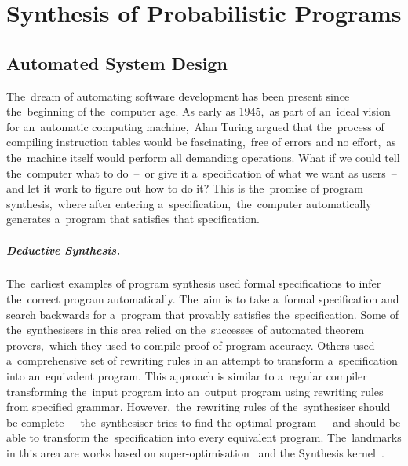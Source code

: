 \chapter{Synthesis of Probabilistic Programs} \label{chap:synthesis_methods}

\section{Automated System Design}

The~dream of automating software development has been present since the~beginning of the~computer age. 
As early as 1945,~as part of an~ideal vision for an~automatic computing machine,~Alan Turing argued that the~process of compiling instruction tables would be fascinating,~free of errors and no effort,~as the~machine itself would perform all demanding operations.
What if we could tell the~computer what to do \,--\, or give it a~specification of what we want as users \,--\, and let it work to figure out how to do it? 
This is the~promise of program synthesis,~where after entering a~specification,~the~computer automatically generates a~program that satisfies that specification.

\paragraph{Deductive Synthesis.}
The~earliest examples of program synthesis used formal specifications to infer the~correct program automatically. 
The~aim is to take a~formal specification and search backwards for a~program that provably satisfies the~specification. 
Some of the~synthesisers in this area relied on the~successes of automated theorem provers,~which they used to compile proof of program accuracy. 
Others used a~comprehensive set of rewriting rules in an attempt to transform a~specification into an~equivalent program. 
This approach is similar to a~regular compiler transforming the~input program into an~output program using rewriting rules from specified grammar. 
However,~the~rewriting rules of the~synthesiser should be complete \,--\, the~synthesiser tries to find the optimal program \,--\, and should be able to transform the~specification into every equivalent program.
The~landmarks in this area are works based on super-optimisation~\cite{superoptimiser} and the Synthesis kernel~\cite{kernel}.

